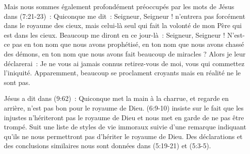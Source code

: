 \begin{enumerate}
\begin{specialpar}{}
Mais nous sommes également profondément préoccupés par les mots de Jésus dans (7:21-23)~:
 \og Quiconque me dit~: Seigneur, Seigneur ! n'entrera pas forcément
 dans le royaume des cieux, mais celui-là seul qui fait la volonté de mon Père
 qui est dans les cieux. Beaucoup me diront en ce jour-là~: Seigneur, Seigneur !
 N'est-ce pas en ton nom que nous avons prophétisé, en ton nom que nous avons
 chassé des démons, en ton nom que nous avons fait beaucoup de miracles ?
 Alors je leur déclarerai~: Je ne vous ai jamais connus retirez-vous de moi,
 vous qui commettez l'iniquité. \fg{}
 Apparemment, beaucoup se proclament croyants mais en réalité ne le sont pas.
\end{specialpar}

\begin{specialpar}{}
Jésus a dit dans (9:62)~: \og Quiconque met la main à la charrue,
 et regarde en arrière, n'est pas bon pour le royaume de Dieu. \fg{}
 \BRallowhypbch{}(6:9-10)\BRforbidhypbch{} insiste sur le fait que
 \og les injustes n'hériteront pas le royaume de Dieu \fg{}
 et nous met en garde de ne pas être trompé. 
 Suit une liste de styles de vie immoraux suivie d'une remarque
 indiquant qu'ils ne nous permettront pas d'hériter le royaume de Dieu.
 Des déclarations et des conclusions similaires nous sont données
 dans (5:19-21) et (5:3-5).
\end{specialpar}


\end{enumerate}
